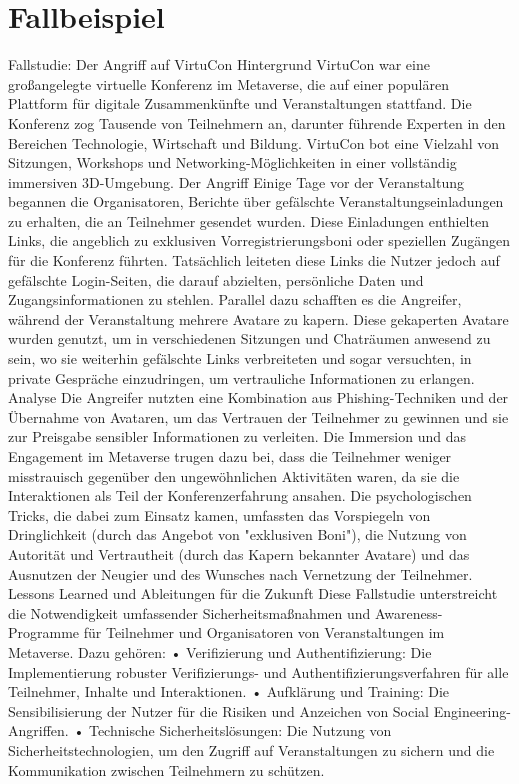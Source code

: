 \section{Fallbeispiel}

Fallstudie: Der Angriff auf VirtuCon
Hintergrund
VirtuCon war eine großangelegte virtuelle Konferenz im Metaverse, die auf einer populären Plattform für digitale Zusammenkünfte und Veranstaltungen stattfand. Die Konferenz zog Tausende von Teilnehmern an, darunter führende Experten in den Bereichen Technologie, Wirtschaft und Bildung. VirtuCon bot eine Vielzahl von Sitzungen, Workshops und Networking-Möglichkeiten in einer vollständig immersiven 3D-Umgebung.
Der Angriff
Einige Tage vor der Veranstaltung begannen die Organisatoren, Berichte über gefälschte Veranstaltungseinladungen zu erhalten, die an Teilnehmer gesendet wurden. Diese Einladungen enthielten Links, die angeblich zu exklusiven Vorregistrierungsboni oder speziellen Zugängen für die Konferenz führten. Tatsächlich leiteten diese Links die Nutzer jedoch auf gefälschte Login-Seiten, die darauf abzielten, persönliche Daten und Zugangsinformationen zu stehlen.
Parallel dazu schafften es die Angreifer, während der Veranstaltung mehrere Avatare zu kapern. Diese gekaperten Avatare wurden genutzt, um in verschiedenen Sitzungen und Chaträumen anwesend zu sein, wo sie weiterhin gefälschte Links verbreiteten und sogar versuchten, in private Gespräche einzudringen, um vertrauliche Informationen zu erlangen.
Analyse
Die Angreifer nutzten eine Kombination aus Phishing-Techniken und der Übernahme von Avataren, um das Vertrauen der Teilnehmer zu gewinnen und sie zur Preisgabe sensibler Informationen zu verleiten. Die Immersion und das Engagement im Metaverse trugen dazu bei, dass die Teilnehmer weniger misstrauisch gegenüber den ungewöhnlichen Aktivitäten waren, da sie die Interaktionen als Teil der Konferenzerfahrung ansahen.
Die psychologischen Tricks, die dabei zum Einsatz kamen, umfassten das Vorspiegeln von Dringlichkeit (durch das Angebot von "exklusiven Boni"), die Nutzung von Autorität und Vertrautheit (durch das Kapern bekannter Avatare) und das Ausnutzen der Neugier und des Wunsches nach Vernetzung der Teilnehmer.
Lessons Learned und Ableitungen für die Zukunft
Diese Fallstudie unterstreicht die Notwendigkeit umfassender Sicherheitsmaßnahmen und Awareness-Programme für Teilnehmer und Organisatoren von Veranstaltungen im Metaverse. Dazu gehören:
	• Verifizierung und Authentifizierung: Die Implementierung robuster Verifizierungs- und Authentifizierungsverfahren für alle Teilnehmer, Inhalte und Interaktionen.
	• Aufklärung und Training: Die Sensibilisierung der Nutzer für die Risiken und Anzeichen von Social Engineering-Angriffen.
	• Technische Sicherheitslösungen: Die Nutzung von Sicherheitstechnologien, um den Zugriff auf Veranstaltungen zu sichern und die Kommunikation zwischen Teilnehmern zu schützen.
